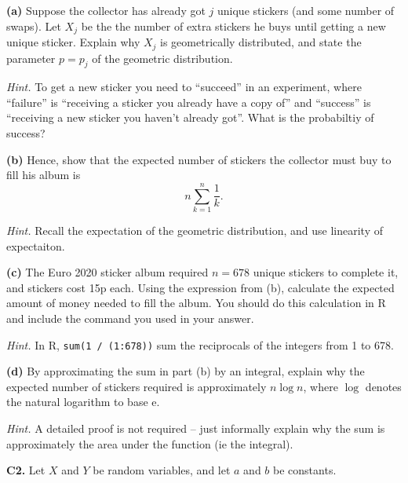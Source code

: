 \documentclass[
  a4paper,
]{book}
\theoremstyle{definition}
\theoremstyle{definition}
\theoremstyle{definition}
\theoremstyle{definition}
\theoremstyle{remark}
\begin{document}
\textbf{(a)} Suppose the collector has already got \(j\) unique stickers (and some number of swaps). Let \(X_j\) be the the number of extra stickers he buys until getting a new unique sticker. Explain why \(X_j\) is geometrically distributed, and state the parameter \(p = p_j\) of the geometric distribution.

\begin{myanswers}
\emph{Hint.} To get a new sticker you need to ``succeed'' in an experiment, where ``failure'' is ``receiving a sticker you already have a copy of'' and ``success'' is ``receiving a new sticker you haven't already got''. What is the probabiltiy of success?

\end{myanswers}

\textbf{(b)} Hence, show that the expected number of stickers the collector must buy to fill his album is
\[ n \sum_{k=1}^n \frac{1}{k} . \]

\begin{myanswers}
\emph{Hint.} Recall the expectation of the geometric distribution, and use linearity of expectaiton.

\end{myanswers}

\textbf{(c)} The Euro 2020 sticker album required \(n = 678\) unique stickers to complete it, and stickers cost 15p each. Using the expression from (b), calculate the expected amount of money needed to fill the album. You should do this calculation in R and include the command you used in your answer.

\begin{myanswers}
\emph{Hint.} In R, \texttt{sum(1\ /\ (1:678))} sum the reciprocals of the integers from 1 to 678.

\end{myanswers}

\textbf{(d)} By approximating the sum in part (b) by an integral, explain why the expected number of stickers required is approximately \(n \log n\), where \(\log\) denotes the natural logarithm to base \(\mathrm e\).

\begin{myanswers}
\emph{Hint.} A detailed proof is not required -- just informally explain why the sum is approximately the area under the function (ie the integral).

\end{myanswers}

\textbf{C2.} Let \(X\) and \(Y\) be random variables, and let \(a\) and \(b\) be constants.
\end{document}
